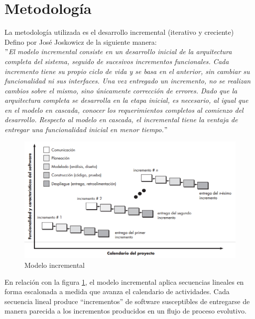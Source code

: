 \section{Metodología}   

La metodología utilizada es el desarrollo incremental (iterativo y creciente)
\\
Defino por José Joskowicz de la siguiente manera:
\\
\textit{$"$El modelo incremental consiste en un desarrollo inicial de la arquitectura completa del sistema, seguido de sucesivos incrementos funcionales. Cada incremento tiene su propio ciclo de vida y se basa en el anterior, sin cambiar su funcionalidad ni sus interfaces. Una vez entregado un incremento, no se realizan cambios sobre el mismo, sino únicamente corrección de errores. Dado que la arquitectura completa se desarrolla en la etapa inicial, es necesario, al igual que en el modelo en cascada, conocer los requerimientos completos al comienzo del desarrollo. 
Respecto al modelo en cascada, el incremental tiene la ventaja de entregar una funcionalidad inicial en menor tiempo.$"$} \cite[pág. 6 - 7]{joskowicz2008reglas}\\



\begin{figure}[hbtp]
\centering
\includegraphics[scale=0.4]{fig/incremental.png}
\caption{\label{metodologia} Modelo incremental}
\end{figure}

En relación con la figura \ref{metodologia}, el modelo incremental aplica secuencias lineales en forma escalonada a medida que avanza el calendario de actividades. Cada secuencia lineal produce “incrementos” de software susceptibles de entregarse \cite{libromcd} de manera parecida a los incrementos producidos en un flujo de proceso evolutivo. \cite[pág. 35]{pressman1988ingenieria}\\


